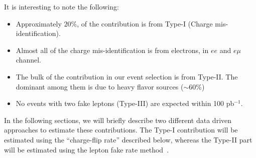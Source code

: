 It is interesting to note the following:
\begin{itemize}
\item Approximately $20 \%$, of the contribution is from Type-I (Charge mis-identification).
\item Almost all of the charge mis-identification is from electrons, in $ee$ and $e\mu$ channel.
\item The bulk of the \ttbar contribution in our event selection is from Type-II. The dominant among them 
is due to heavy flavor sources ($\sim 60 \%$)
\item No events with two fake leptons (Type-III) are expected within 100 pb$^{-1}$.
\end{itemize} 

In the following sections, we will briefly describe two different data driven approaches to 
estimate these contributions. The Type-I contribution will be estimated using the ``charge-flip rate'' described below, 
whereas the Type-II part will be estimated using the lepton fake rate method~\cite{fakelep}.



